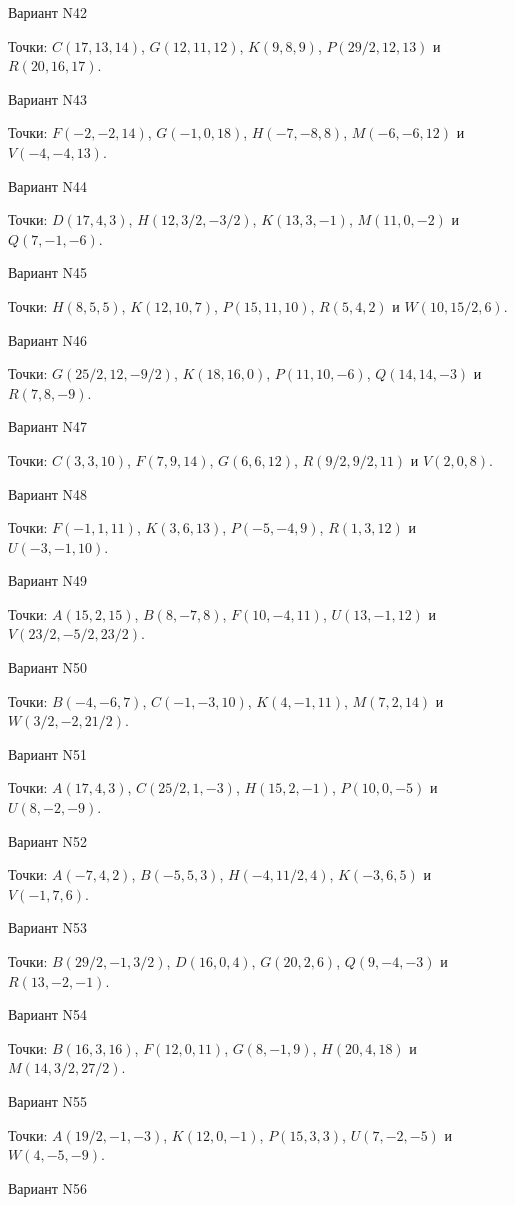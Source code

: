 \documentclass[11pt]{report}
\begin{document}
Вариант N42

Точки: $C(17, 13, 14)$, $G(12, 11, 12)$, $K(9, 8, 9)$, $P(29/2, 12, 13)$ и $R(20, 16, 17)$.

Вариант N43

Точки: $F(-2, -2, 14)$, $G(-1, 0, 18)$, $H(-7, -8, 8)$, $M(-6, -6, 12)$ и $V(-4, -4, 13)$.

Вариант N44

Точки: $D(17, 4, 3)$, $H(12, 3/2, -3/2)$, $K(13, 3, -1)$, $M(11, 0, -2)$ и $Q(7, -1, -6)$.

Вариант N45

Точки: $H(8, 5, 5)$, $K(12, 10, 7)$, $P(15, 11, 10)$, $R(5, 4, 2)$ и $W(10, 15/2, 6)$.

Вариант N46

Точки: $G(25/2, 12, -9/2)$, $K(18, 16, 0)$, $P(11, 10, -6)$, $Q(14, 14, -3)$ и $R(7, 8, -9)$.

Вариант N47

Точки: $C(3, 3, 10)$, $F(7, 9, 14)$, $G(6, 6, 12)$, $R(9/2, 9/2, 11)$ и $V(2, 0, 8)$.

Вариант N48

Точки: $F(-1, 1, 11)$, $K(3, 6, 13)$, $P(-5, -4, 9)$, $R(1, 3, 12)$ и $U(-3, -1, 10)$.

Вариант N49

Точки: $A(15, 2, 15)$, $B(8, -7, 8)$, $F(10, -4, 11)$, $U(13, -1, 12)$ и $V(23/2, -5/2, 23/2)$.

Вариант N50

Точки: $B(-4, -6, 7)$, $C(-1, -3, 10)$, $K(4, -1, 11)$, $M(7, 2, 14)$ и $W(3/2, -2, 21/2)$.

Вариант N51

Точки: $A(17, 4, 3)$, $C(25/2, 1, -3)$, $H(15, 2, -1)$, $P(10, 0, -5)$ и $U(8, -2, -9)$.

Вариант N52

Точки: $A(-7, 4, 2)$, $B(-5, 5, 3)$, $H(-4, 11/2, 4)$, $K(-3, 6, 5)$ и $V(-1, 7, 6)$.

Вариант N53

Точки: $B(29/2, -1, 3/2)$, $D(16, 0, 4)$, $G(20, 2, 6)$, $Q(9, -4, -3)$ и $R(13, -2, -1)$.

Вариант N54

Точки: $B(16, 3, 16)$, $F(12, 0, 11)$, $G(8, -1, 9)$, $H(20, 4, 18)$ и $M(14, 3/2, 27/2)$.

Вариант N55

Точки: $A(19/2, -1, -3)$, $K(12, 0, -1)$, $P(15, 3, 3)$, $U(7, -2, -5)$ и $W(4, -5, -9)$.

Вариант N56
\end{document}
